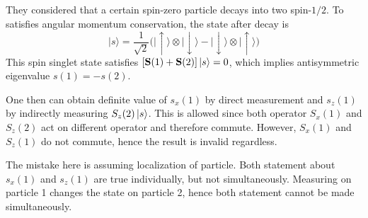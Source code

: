 \documentclass[../../../main.tex]{subfiles}
\begin{document}
They considered that a certain spin-zero particle decays into two spin-$1/2$.
To satisfies angular momentum conservation, the state after decay is
\begin{equation*}
  \lvert s\rangle = \frac{1}{\sqrt{2}}\bigl(\lvert\uparrow\rangle\otimes\lvert\downarrow\rangle - \lvert\downarrow\rangle\otimes\lvert\uparrow\rangle\bigr)
\end{equation*}
This spin singlet state satisfies $[\mathbf{S}(1) + \mathbf{S}(2)] \ket{s} =0$, which implies antisymmetric eigenvalue $s(1)=-s(2)$.

One then can obtain definite value of $s_x(1)$ by direct measurement and $s_z(1)$ by indirectly measuring $S_z(2) \ket{s}$.
This is allowed since both operator $S_x(1)$ and $S_z(2)$ act on different operator and therefore commute.
However, $S_x(1)$ and $S_z(1)$ do not commute, hence the result is invalid regardless.

The mistake here is assuming localization of particle.
Both statement about $s_x(1)$ and $s_z(1)$ are true individually, but not simultaneously.
Measuring on particle 1 changes the state on particle 2, hence both statement cannot be made simultaneously.
\end{document}

